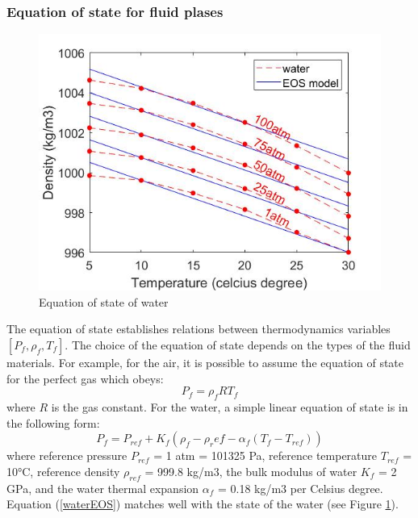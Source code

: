\documentclass[preprint,12pt]{elsarticle}
\begin{document}
\subsubsection{Equation of state for fluid plases}
%
%
\begin{figure}[h]
\center
\includegraphics[scale=.5]{water1.jpg}
\caption{Equation of state of water}
\label{fig:water1}
\end{figure}
%
%
The equation of state establishes relations between thermodynamics variables $[P_f, \rho_f, T_f]$. The choice of the equation of state depends on the types of the fluid materials. For example, for the air, it is possible to assume the equation of state for the perfect gas which obeys:
%
%
\begin{equation}
    P_f = \rho_f R T_f
\end{equation}
%
%
where $R$ is the gas constant. For the water, a simple linear equation of state is in the following form:
%
%
\begin{equation}
    P_f = P_{ref} + K_f (\rho_f - \rho_ref - \alpha_f(T_f - T_{ref}))
\label{waterEOS}
\end{equation}
%
%
where reference pressure $P_{ref}$ = 1 atm = 101325 Pa, reference temperature $T_{ref}$ = 10°C, reference density  $\rho_{ref}$ = 999.8 kg/m3, the bulk modulus of water $K_f$ = 2 GPa, and the water thermal expansion $\alpha_f$ = 0.18 kg/m3 per Celsius degree. Equation (\ref{waterEOS}) matches well with the state of the water (see Figure \ref{fig:water1}).
\end{document}
